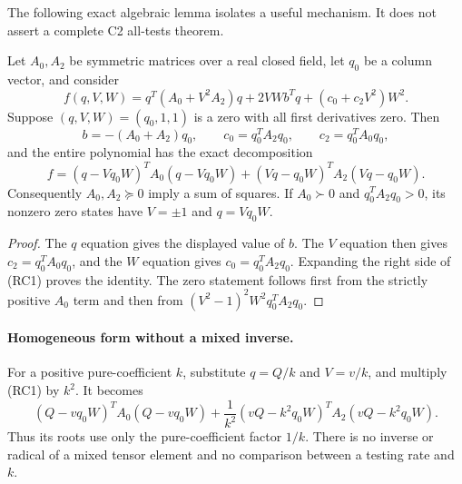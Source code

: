 \label{pa142a027a282:sec:ui-reciprocal-contact}

The following exact algebraic lemma isolates a useful mechanism. It
does not assert a complete C2 all-tests theorem.

\begin{lemma}
Let $A_0,A_2$ be symmetric matrices over a real closed field, let
$q_0$ be a column vector, and consider
\[
 f(q,V,W)=q^T(A_0+V^2A_2)q+2VW b^Tq+(c_0+c_2V^2)W^2.
\]
Suppose $(q,V,W)=(q_0,1,1)$ is a zero with all first derivatives
zero. Then
\[
 b=-(A_0+A_2)q_0,\qquad
 c_0=q_0^TA_2q_0,\qquad c_2=q_0^TA_0q_0,
\]
and the entire polynomial has the exact decomposition
\[
 \boxed{f=(q-Vq_0W)^TA_0(q-Vq_0W)
             +(Vq-q_0W)^TA_2(Vq-q_0W).}             \tag{RC1}
\]
Consequently $A_0,A_2\succeq0$ imply a sum of squares. If
$A_0\succ0$ and $q_0^TA_2q_0>0$, its nonzero zero states have
$V=\pm1$ and $q=Vq_0W$.
\end{lemma}
\begin{proof}
The $q$ equation gives the displayed value of $b$. The $V$
equation then gives $c_2=q_0^TA_0q_0$, and the $W$ equation gives
$c_0=q_0^TA_2q_0$. Expanding the right side of (RC1) proves the
identity. The zero statement follows first from the strictly positive
$A_0$ term and then from $(V^2-1)^2W^2q_0^TA_2q_0$.
\end{proof}

\paragraph{Homogeneous form without a mixed inverse.}
For a positive pure-coefficient $k$, substitute $q=Q/k$ and
$V=v/k$, and multiply (RC1) by $k^2$. It becomes
\[
 (Q-vq_0W)^TA_0(Q-vq_0W)
 +\frac1{k^2}(vQ-k^2q_0W)^TA_2(vQ-k^2q_0W).       \tag{RC2}
\]
Thus its roots use only the pure-coefficient factor $1/k$.
There is no inverse or radical of a mixed tensor element and no
comparison between a testing rate and $k$.

